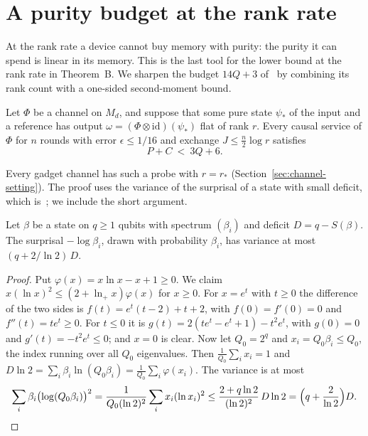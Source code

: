 \section{A purity budget at the rank rate}\label{sec:purity-budget}

At the rank rate a device cannot buy memory with purity: the purity it can spend is linear in its memory. This is the last tool for the lower
bound at the rank rate in Theorem~B. We sharpen the budget $14Q+3$ of~\cite{DouglasMghirbiB} by combining its rank count with a one-sided
second-moment bound.

\begin{proposition}\label{prop:purity-budget}
Let $\Phi$ be a channel on $M_d$, and suppose that some pure state $\psi_*$ of the input and a reference has output
$\omega=(\Phi\otimes\mathrm{id})(\psi_*)$ flat of rank $r$. Every causal service of $\Phi$ for $n$ rounds with error $\epsilon\le1/16$ and exchange
$J\le\frac n2\log r$ satisfies
\[
P+C\ <\ 3Q+6 .
\]
\end{proposition}

Every gadget channel has such a probe with $r=r_*$ (Section~\ref{sec:channel-setting}). The proof uses the variance of the surprisal of a
state with small deficit, which is~\cite[Lemma~5.9]{DouglasMghirbiB}; we include the short argument.

\begin{lemma}\label{lem:surprisal}
Let $\beta$ be a state on $q\ge1$ qubits with spectrum $(\beta_i)$ and deficit $D=q-S(\beta)$. The surprisal $-\log\beta_i$, drawn with probability
$\beta_i$, has variance at most $(q+2/\ln2)\,D$.
\end{lemma}

\begin{proof}
Put $\varphi(x)=x\ln x-x+1\ge0$. We claim $x(\ln x)^2\le(2+\ln_+x)\varphi(x)$ for $x\ge0$. For $x=e^t$ with $t\ge0$ the difference of the two sides
is $f(t)=e^t(t-2)+t+2$, with $f(0)=f'(0)=0$ and $f''(t)=te^t\ge0$. For $t\le0$ it is $g(t)=2(te^t-e^t+1)-t^2e^t$, with $g(0)=0$ and
$g'(t)=-t^2e^t\le0$; and $x=0$ is clear. Now let $Q_0=2^q$ and $x_i=Q_0\beta_i\le Q_0$, the index running over all $Q_0$ eigenvalues. Then
$\frac1{Q_0}\sum_ix_i=1$ and $D\ln2=\sum_i\beta_i\ln(Q_0\beta_i)=\frac1{Q_0}\sum_i\varphi(x_i)$. The variance is at most
\[
\sum_i\beta_i\bigl(\log(Q_0\beta_i)\bigr)^2=\frac1{Q_0(\ln2)^2}\sum_ix_i(\ln x_i)^2\le\frac{2+q\ln2}{(\ln2)^2}\,D\ln2=\Bigl(q+\frac2{\ln2}\Bigr)D .
\]
\end{proof}

